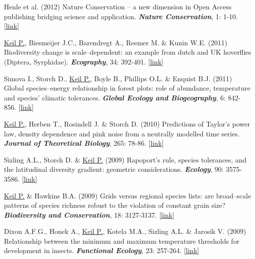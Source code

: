 \begin{etaremune}
\item Henle et al. (2012) Nature Conservation -- a new dimension in Open Access publishing bridging science and application. \textit{\textbf{Nature Conservation}}, 1: 1-10. [\href{http://www.pensoft.net/journals/natureconservation/article/3081/abstract/}{link}]

\item \underline{Keil P.}, Biesmeijer J.C., Barendregt A., Reemer M. \& Kunin W.E. (2011) Biodiversity change is scale--dependent: an example from dutch and UK hoverflies (Diptera, Syrphidae). \textit{\textbf{Ecography}}, 34: 392-401. [\href{http://onlinelibrary.wiley.com/doi/10.1111/j.1600-0587.2010.06554.x/abstract}{link}]

\item Simova I., Storch D., \underline{Keil P.}, Boyle B., Phillips O.L. \& Enquist B.J. (2011) Global species--energy relationship in forest plots: role of abundance, temperature and species' climatic tolerances. \textit{\textbf{Global Ecology and Biogeography}}, 6: 842-856. [\href{http://onlinelibrary.wiley.com/doi/10.1111/j.1466-8238.2011.00650.x/abstract}{link}] 

\item \underline{Keil P.}, Herben T., Rosindell J. \& Storch D. (2010) Predictions of Taylor's power law, density dependence and pink noise from a neutrally modelled time series. \textit{\textbf{Journal of Theoretical Biology}}, 265: 78-86. [\href{http://www.sciencedirect.com/science/article/pii/S0022519310001979}{link}]

\item Sizling A.L., Storch D. \& \underline{Keil P.} (2009) Rapoport's rule, species tolerances, and the latitudinal diversity gradient: geometric considerations. \textit{\textbf{Ecology}}, 90: 3575-3586. [\href{http://www.esajournals.org/doi/abs/10.1890/08-1129.1?journalCode=ecol}{link}]

\item \underline{Keil P.} \& Hawkins B.A. (2009) Grids versus regional species lists: are broad--scale patterns of species richness robust to the violation of constant grain size? \textit{\textbf{Biodiversity and Conservation}}, 18: 3127-3137. [\href{http://link.springer.com/article/10.1007%2Fs10531-009-9631-5}{link}]

\item Dixon A.F.G., Honek A., \underline{Keil P.}, Kotela M.A., Sizling A.L. \& Jarosik V. (2009) Relationship between the minimum and maximum temperature thresholds for development in insects. \textit{\textbf{Functional Ecology}}, 23: 257-264. [\href{http://onlinelibrary.wiley.com/doi/10.1111/j.1365-2435.2008.01489.x/abstract}{link}]


\end{etaremune}
